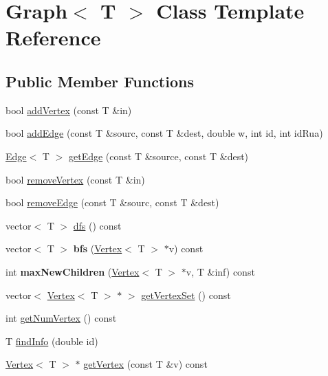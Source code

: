 \hypertarget{class_graph}{}\section{Graph$<$ T $>$ Class Template Reference}
\label{class_graph}
\subsection*{Public Member Functions}
\begin{DoxyCompactItemize}
\item 
bool \hyperlink{class_graph_a00be284ea2be3b3d0f0d2e493b70245b}{add\+Vertex} (const T \&in)
\item 
bool \hyperlink{class_graph_a15aafe73d3523d78f4be24cd41b02c6b}{add\+Edge} (const T \&sourc, const T \&dest, double w, int id, int id\+Rua)
\item 
\hyperlink{class_edge}{Edge}$<$ T $>$ \hyperlink{class_graph_a3e43c4322abd26753ed9a33ebba17067}{get\+Edge} (const T \&source, const T \&dest)
\item 
bool \hyperlink{class_graph_af9c903104ad69a7782979fa9caedf163}{remove\+Vertex} (const T \&in)
\item 
bool \hyperlink{class_graph_a1106092a37366486cf55576f9ec01692}{remove\+Edge} (const T \&sourc, const T \&dest)
\item 
vector$<$ T $>$ \hyperlink{class_graph_a911798b1a89f8c4ae90ba3eee849cff8}{dfs} () const
\item 
\mbox{\label{class_graph_a56a5ea2c3aa7c0bd3849849be404a631}} 
vector$<$ T $>$ {\bfseries bfs} (\hyperlink{class_vertex}{Vertex}$<$ T $>$ $\ast$v) const
\item 
\mbox{\label{class_graph_a675559f8cddfe43bc416023ad9f28cfa}} 
int {\bfseries max\+New\+Children} (\hyperlink{class_vertex}{Vertex}$<$ T $>$ $\ast$v, T \&inf) const
\item 
vector$<$ \hyperlink{class_vertex}{Vertex}$<$ T $>$ $\ast$ $>$ \hyperlink{class_graph_a923b43995f81ad9319bbc81a1e433e64}{get\+Vertex\+Set} () const
\item 
int \hyperlink{class_graph_a0853eac15cdf0f06d63f4b8a7820ec71}{get\+Num\+Vertex} () const
\item 
T \hyperlink{class_graph_aa8d29bce3bdde30a467af15cd67bebcf}{find\+Info} (double id)
\item 
\hyperlink{class_vertex}{Vertex}$<$ T $>$ $\ast$ \hyperlink{class_graph_a67453d232f04e85c642b51554df1bc6a}{get\+Vertex} (const T \&v) const

\end{DoxyCompactItemize}
